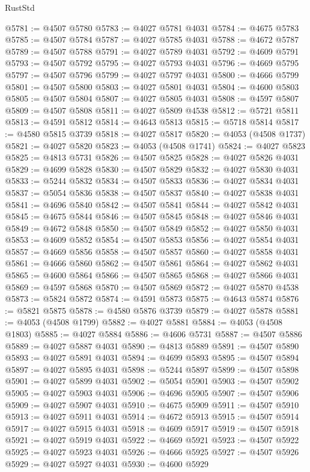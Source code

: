 \begin{lexlean}{RustStd}
\begin{coremodule}
@5781 := @4507 @5780
@5783 := @4027 @5781 @4031
@5784 := @4675 @5783
@5785 := @4507 @5784
@5787 := @4027 @5785 @4031
@5788 := @4672 @5787
@5789 := @4507 @5788
@5791 := @4027 @5789 @4031
@5792 := @4609 @5791
@5793 := @4507 @5792
@5795 := @4027 @5793 @4031
@5796 := @4669 @5795
@5797 := @4507 @5796
@5799 := @4027 @5797 @4031
@5800 := @4666 @5799
@5801 := @4507 @5800
@5803 := @4027 @5801 @4031
@5804 := @4600 @5803
@5805 := @4507 @5804
@5807 := @4027 @5805 @4031
@5808 := @4597 @5807
@5809 := @4507 @5808
@5811 := @4027 @5809 @4538
@5812 := @5721 @5811
@5813 := @4591 @5812
@5814 := @4643 @5813
@5815 := @5718 @5814
@5817 := @4580 @5815 @3739
@5818 := @4027 @5817
@5820 := @4053 (@4508 @1737)
@5821 := @4027 @5820
@5823 := @4053 (@4508 @1741)
@5824 := @4027 @5823
@5825 := @4813 @5731
@5826 := @4507 @5825
@5828 := @4027 @5826 @4031
@5829 := @4699 @5828
@5830 := @4507 @5829
@5832 := @4027 @5830 @4031
@5833 := @5244 @5832
@5834 := @4507 @5833
@5836 := @4027 @5834 @4031
@5837 := @5054 @5836
@5838 := @4507 @5837
@5840 := @4027 @5838 @4031
@5841 := @4696 @5840
@5842 := @4507 @5841
@5844 := @4027 @5842 @4031
@5845 := @4675 @5844
@5846 := @4507 @5845
@5848 := @4027 @5846 @4031
@5849 := @4672 @5848
@5850 := @4507 @5849
@5852 := @4027 @5850 @4031
@5853 := @4609 @5852
@5854 := @4507 @5853
@5856 := @4027 @5854 @4031
@5857 := @4669 @5856
@5858 := @4507 @5857
@5860 := @4027 @5858 @4031
@5861 := @4666 @5860
@5862 := @4507 @5861
@5864 := @4027 @5862 @4031
@5865 := @4600 @5864
@5866 := @4507 @5865
@5868 := @4027 @5866 @4031
@5869 := @4597 @5868
@5870 := @4507 @5869
@5872 := @4027 @5870 @4538
@5873 := @5824 @5872
@5874 := @4591 @5873
@5875 := @4643 @5874
@5876 := @5821 @5875
@5878 := @4580 @5876 @3739
@5879 := @4027 @5878
@5881 := @4053 (@4508 @1799)
@5882 := @4027 @5881
@5884 := @4053 (@4508 @1803)
@5885 := @4027 @5884
@5886 := @4606 @5731
@5887 := @4507 @5886
@5889 := @4027 @5887 @4031
@5890 := @4813 @5889
@5891 := @4507 @5890
@5893 := @4027 @5891 @4031
@5894 := @4699 @5893
@5895 := @4507 @5894
@5897 := @4027 @5895 @4031
@5898 := @5244 @5897
@5899 := @4507 @5898
@5901 := @4027 @5899 @4031
@5902 := @5054 @5901
@5903 := @4507 @5902
@5905 := @4027 @5903 @4031
@5906 := @4696 @5905
@5907 := @4507 @5906
@5909 := @4027 @5907 @4031
@5910 := @4675 @5909
@5911 := @4507 @5910
@5913 := @4027 @5911 @4031
@5914 := @4672 @5913
@5915 := @4507 @5914
@5917 := @4027 @5915 @4031
@5918 := @4609 @5917
@5919 := @4507 @5918
@5921 := @4027 @5919 @4031
@5922 := @4669 @5921
@5923 := @4507 @5922
@5925 := @4027 @5923 @4031
@5926 := @4666 @5925
@5927 := @4507 @5926
@5929 := @4027 @5927 @4031
@5930 := @4600 @5929

\end{coremodule}
\end{lexlean}
